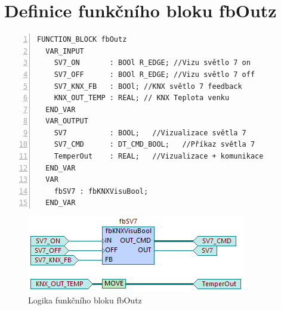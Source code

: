 \chapter{Definice funkčního bloku fbOutz}
\label{apend:fbOutz}
\begin{lstlisting}[language=ST, breaklines=true, numbers=left, numberstyle=\small, numbersep=10pt, frame=single, basicstyle=\ttfamily\small, caption={Definice funkčního bloku fbOutz}, label={lst:fbOutz}]
  FUNCTION_BLOCK fbOutz
  VAR_INPUT
    SV7_ON       : BOOl R_EDGE; //Vizu světlo 7 on
    SV7_OFF      : BOOl R_EDGE; //Vizu světlo 7 off
    SV7_KNX_FB   : BOOl; //KNX světlo 7 feedback
    KNX_OUT_TEMP : REAL; // KNX Teplota venku
  END_VAR
  VAR_OUTPUT
    SV7          : BOOL;   //Vizualizace světla 7
    SV7_CMD      : DT_CMD_BOOL;   //Příkaz světla 7
    TemperOut    : REAL;   //Vizualizace + komunikace
  END_VAR
  VAR
    fbSV7 : fbKNXVisuBool;
  END_VAR
\end{lstlisting}
\begin{figure}[!ht]
  \begin{center}
  \includegraphics[scale=1.0]{obrazky/fbOutz.png}
  \end{center}
  \caption[Logika funkčního bloku fbOutz]{Logika funkčního bloku fbOutz}
  \label{fig:fbOutz}
\end{figure}
\pagebreak

